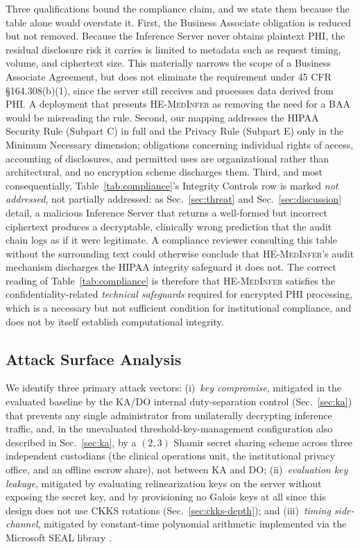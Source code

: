 \documentclass[journal,compsoc]{IEEEtran}
\newcommand{\framework}{\textsc{HE-MedInfer}}
\begin{document}
Three qualifications bound the compliance claim, and we state them because the
table alone would overstate it. First, the Business Associate obligation is
reduced but not removed. Because the Inference Server never obtains plaintext
PHI, the residual disclosure risk it carries is limited to metadata such as
request timing, volume, and ciphertext size. This materially narrows the scope
of a Business Associate Agreement, but does not eliminate the requirement under
45 CFR \S164.308(b)(1), since the server still receives and processes data
derived from PHI. A deployment that presents \framework{} as removing the need
for a BAA would be misreading the rule. Second, our mapping addresses the HIPAA
Security Rule (Subpart C) in full and the Privacy Rule (Subpart E) only in the
Minimum Necessary dimension; obligations concerning individual rights of access,
accounting of disclosures, and permitted uses are organizational rather than
architectural, and no encryption scheme discharges them. Third, and most
consequentially, Table~\ref{tab:compliance}'s Integrity Controls row is marked
\emph{not addressed}, not partially addressed: as Sec.~\ref{sec:threat} and
Sec.~\ref{sec:discussion} detail, a malicious Inference Server that returns a
well-formed but incorrect ciphertext produces a decryptable, clinically wrong
prediction that the audit chain logs as if it were legitimate. A compliance
reviewer consulting this table without the surrounding text could otherwise
conclude that \framework{}'s audit mechanism discharges the HIPAA integrity
safeguard it does not. The correct reading of Table~\ref{tab:compliance} is
therefore that \framework{} satisfies the confidentiality-related
\emph{technical safeguards} required for encrypted PHI processing, which is a
necessary but not sufficient condition for institutional compliance, and does
not by itself establish computational integrity.

\subsection{Attack Surface Analysis}

We identify three primary attack vectors: (i)~\emph{key compromise}, mitigated
in the evaluated baseline by the KA/DO internal duty-separation control
(Sec.~\ref{sec:ka}) that prevents any single administrator from unilaterally
decrypting inference traffic, and, in the unevaluated threshold-key-management
configuration also described in Sec.~\ref{sec:ka}, by a $(2,3)$ Shamir secret
sharing scheme across three independent custodians (the clinical operations
unit, the institutional privacy office, and an offline escrow share), not
between KA and DO; (ii)~\emph{evaluation key leakage}, mitigated by evaluating
relinearization keys on the server without exposing the secret key, and by
provisioning no Galois keys at all since this design does not use CKKS
rotations (Sec.~\ref{sec:ckks-depth}); and
(iii)~\emph{timing side-channel}, mitigated by constant-time polynomial
arithmetic implemented via the Microsoft SEAL library \cite{seal2024}.
\end{document}
